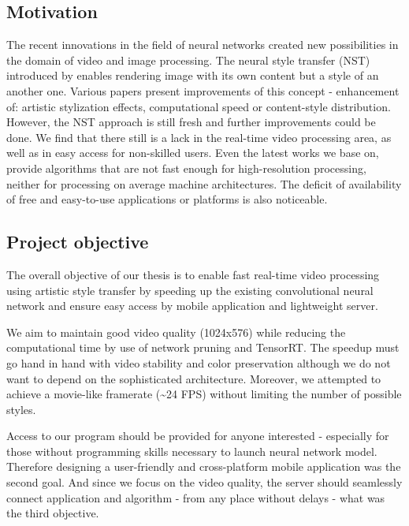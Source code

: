 \documentclass[../Main.tex]{subfiles}
\begin{document}
\subsection{Motivation}
The recent innovations in the field of neural networks created new possibilities in the domain of video and image processing. The neural style transfer (NST) introduced by \cite{gatys2015neural} enables rendering image with its own content but a style of an another one. Various papers present improvements of this concept - enhancement of: artistic stylization effects, computational speed or content-style distribution. However, the NST approach is still fresh and further improvements could be done. We find that there still is a lack in the real-time video processing area, as well as in easy access for non-skilled users. Even the latest works we base on, provide algorithms that are not fast enough for high-resolution processing, neither for processing on average machine architectures. The deficit of availability of free and easy-to-use applications or platforms is also noticeable.


\subsection{Project objective}
The overall objective of our thesis is to enable fast real-time video processing using artistic style transfer by speeding up the existing convolutional neural network and ensure easy access by mobile application and lightweight server.

We aim to maintain good video quality (1024x576) while reducing the computational time by use of network pruning and TensorRT. The speedup must go hand in hand with video stability and color preservation although we do not want to depend on the sophisticated architecture. Moreover, we attempted to achieve a movie-like framerate (\textasciitilde{}24 FPS) without limiting the number of possible styles.

Access to our program should be provided for anyone interested - especially for those without programming skills necessary to launch neural network model. Therefore designing a user-friendly and cross-platform mobile application was the second goal. And since we focus on the video quality, the server should seamlessly connect application and algorithm - from any place without delays - what was the third objective.

\newpage
\end{document}
